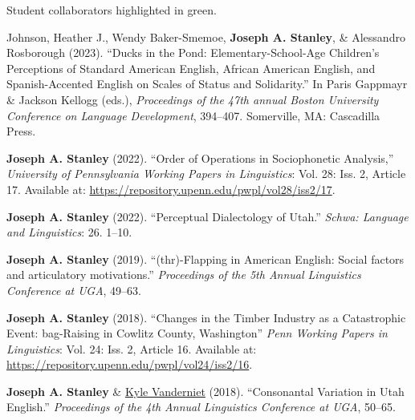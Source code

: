 \documentclass[
]{article}
\begin{document}
\begin{tcolorbox}[enhanced jigsaw, left=2mm, title=\textcolor{quarto-callout-note-color}{\faInfo}\hspace{0.5em}{Note}, leftrule=.75mm, bottomtitle=1mm, arc=.35mm, breakable, colbacktitle=quarto-callout-note-color!10!white, opacitybacktitle=0.6, colback=white, colframe=quarto-callout-note-color-frame, toptitle=1mm, bottomrule=.15mm, coltitle=black, opacityback=0, rightrule=.15mm, toprule=.15mm, titlerule=0mm]

Student collaborators highlighted in {green}.

\end{tcolorbox}

{Johnson, Heather J.}, Wendy Baker-Smemoe, \textbf{Joseph A. Stanley},
\& Alessandro Rosborough (2023). ``Ducks in the Pond:
Elementary-School-Age Children's Perceptions of Standard American
English, African American English, and Spanish-Accented English on
Scales of Status and Solidarity.'' In Paris Gappmayr \& Jackson Kellogg
(eds.), \emph{Proceedings of the 47th annual Boston University
Conference on Language Development}, 394--407. Somerville, MA:
Cascadilla Press.

\textbf{Joseph A. Stanley} (2022). ``Order of Operations in
Sociophonetic Analysis,'' \emph{University of Pennsylvania Working
Papers in Linguistics}: Vol. 28: Iss. 2, Article 17. Available at:
\href{https://repository.upenn.edu/pwpl/vol28/iss2/17/}{https://repository.upenn.edu/pwpl/vol28/iss2/17}.

\textbf{Joseph A. Stanley} (2022). ``Perceptual Dialectology of Utah.''
\emph{Schwa: Language and Linguistics}: 26. 1--10.

\textbf{Joseph A. Stanley} (2019). ``(thr)-Flapping in American English:
Social factors and articulatory motivations.'' \emph{Proceedings of the
5th Annual Linguistics Conference at UGA}, 49--63.

\textbf{Joseph A. Stanley} (2018). ``Changes in the Timber Industry as a
Catastrophic Event: bag-Raising in Cowlitz County, Washington''
\emph{Penn Working Papers in Linguistics}: Vol. 24: Iss. 2, Article 16.
Available at:
\href{https://repository.upenn.edu/pwpl/vol24/iss2/16/}{https://repository.upenn.edu/pwpl/vol24/iss2/16}.

\textbf{Joseph A. Stanley} \&
\href{https://clyguy.wixsite.com/profile}{Kyle Vanderniet} (2018).
``Consonantal Variation in Utah English.'' \emph{Proceedings of the 4th
Annual Linguistics Conference at UGA}, 50--65.
\end{document}
